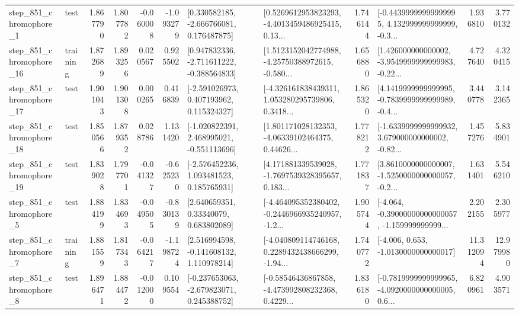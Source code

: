 \begin{tabular}{llrrrrllrlrr}
   step\_851\_chromophore\_1 &      test &      1.867790 &    1.807782 &     -0.060008 & -1.093279 &    [0.330582185, -2.666766081, 0.176487875] &  [0.5269612953823293, -4.4013459486925415, 0.13... &       1.746144 &  [-0.44399999999999995, 4.132999999999999, -0.3... &            1.936810 &          3.770132 \\
  step\_851\_chromophore\_16 &  training &      1.872689 &    1.893256 &      0.020567 &  0.925502 &   [0.947832336, -2.711611222, -0.388564833] &  [1.5123152042774988, -4.25750388972615, -0.580... &       1.656880 &  [1.426000000000002, -3.9549999999999983, -0.22... &            4.727640 &          4.320415 \\
  step\_851\_chromophore\_17 &      test &      1.901043 &    1.901308 &      0.000265 &  0.416839 &    [-2.591026973, 0.407193962, 0.115324327] &  [-4.326161838439311, 1.053280295739806, 0.3418... &       1.865320 &  [4.1419999999999995, -0.7839999999999989, -0.4... &            3.440778 &          3.142365 \\
  step\_851\_chromophore\_18 &      test &      1.850566 &    1.879352 &      0.028786 &  1.131420 &   [-1.020822391, 2.468995021, -0.551113696] &  [1.801171028132353, -4.06339102464375, 0.44626... &       1.778212 &  [-1.6339999999999932, 3.679000000000002, -0.82... &            1.457276 &          5.834901 \\
  step\_851\_chromophore\_19 &      test &      1.839028 &    1.797701 &     -0.041327 & -0.625230 &    [-2.576452236, 1.093481523, 0.185765931] &  [4.171881339539028, -1.7697539328395657, 0.183... &       1.771837 &  [3.8610000000000007, -1.5250000000000057, -0.2... &            1.631401 &          5.546210 \\
   step\_851\_chromophore\_5 &      test &      1.884199 &    1.834693 &     -0.049505 & -0.830139 &      [2.640659351, 0.33340079, 0.683802089] &  [-4.464095352380402, -0.2446966935240957, -1.2... &       1.905744 &  [-4.064, -0.39000000000000057, -1.159999999999... &            2.202155 &          2.305977 \\
   step\_851\_chromophore\_7 &  training &      1.881559 &    1.817343 &     -0.064217 & -1.198724 &    [2.516994598, -0.141608132, 1.110978214] &  [-4.040809114746168, 0.2289432438666299, -1.94... &       1.740772 &               [-4.006, 0.653, -1.0130000000000017] &           11.312094 &         12.979980 \\
   step\_851\_chromophore\_8 &      test &      1.896471 &    1.884472 &     -0.012000 &  0.109554 &   [-0.237653063, -2.679823071, 0.245388752] &  [-0.58546436867858, -4.473992808232368, 0.4229... &       1.836180 &  [-0.7819999999999965, -4.0920000000000005, 0.6... &            6.820961 &          4.903571 \\

\end{tabular}
